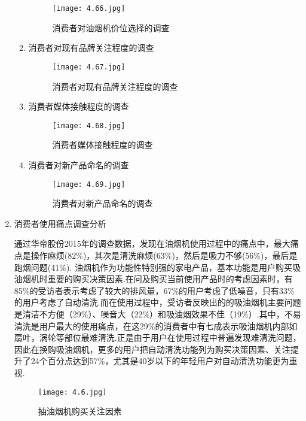 \begin{enumerate}
\begin{enumerate}[(1)]
      \begin{figure}[H]
      \centering
      \texttt{[image: 4.66.jpg]}
      \caption{消费者对油烟机价位选择的调查}
      \label{消费者对油烟机价位选择的调查}
      \end{figure}

\item 消费者对现有品牌关注程度的调查

      \begin{figure}[H]
      \centering
      \texttt{[image: 4.67.jpg]}
      \caption{消费者对现有品牌关注程度的调查}
      \label{消费者对现有品牌关注程度的调查}
      \end{figure}

\item 消费者媒体接触程度的调查

      \begin{figure}[H]
      \centering
      \texttt{[image: 4.68.jpg]}
      \caption{消费者媒体接触程度的调查}
      \label{消费者媒体接触程度的调查}
      \end{figure}

\item 消费者对新产品命名的调查

      \begin{figure}[H]
      \centering
      \texttt{[image: 4.69.jpg]}
      \caption{消费者对新产品命名的调查}
      \label{消费者对新产品命名的调查}
      \end{figure}
\end{enumerate}


\item 消费者使用痛点调查分析

      通过华帝股份2015年的调查数据，发现在油烟机使用过程中的痛点中，最大痛点是操作麻烦(82\%)，其次是清洗麻烦(63\%)，然后是吸力不够(56\%)，最后是跑烟问题(41\%).
      油烟机作为功能性特别强的家电产品，基本功能是用户购买吸油烟机时重要的购买决策因素.在问及购买当前使用产品时的考虑因素时，有85\%的受访者表示考虑了较大的排风量，67\%的用户考虑了低噪音，只有33\%的用户考虑了自动清洗.而在使用过程中，受访者反映出的的吸油烟机主要问题是清洁不方便（29\%）、噪音大（22\%）和吸油烟效果不佳（19\%）.其中，不易清洗是用户最大的使用痛点，在这29\%的消费者中有七成表示吸油烟机内部如扇叶，涡轮等部位最难清洗.正是由于用户在使用过程中普遍发现难清洗问题，因此在换购吸油烟机，更多的用户把自动清洗功能列为购买决策因素、关注提升了24个百分点达到57\%，尤其是40岁以下的年轻用户对自动清洗功能更为重视.

      \begin{figure}[H]
      \centering
      \texttt{[image: 4.6.jpg]}
      \caption{抽油烟机购买关注因素}
      \label{抽油烟机购买关注因素}
      \end{figure}


\end{enumerate}
